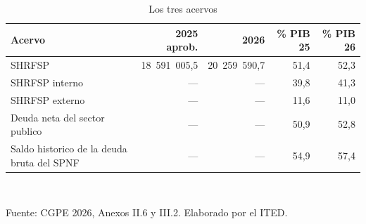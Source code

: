 \begin{table}[htbp]
\centering
\scriptsize
\caption{Los tres acervos}
\label{cua:C13_2}
\begin{tabular}{p{6.4cm}rrrr}
\toprule
\textbf{Acervo} & \textbf{2025 aprob.} & \textbf{2026} & \textbf{\% PIB 25} & \textbf{\% PIB 26} \\
\midrule
SHRFSP & 18 591 005,5 & 20 259 590,7 & 51,4 & 52,3 \\
SHRFSP interno & --- & --- & 39,8 & 41,3 \\
SHRFSP externo & --- & --- & 11,6 & 11,0 \\
Deuda neta del sector publico & --- & --- & 50,9 & 52,8 \\
Saldo historico de la deuda bruta del SPNF & --- & --- & 54,9 & 57,4 \\
\bottomrule
\end{tabular}
\\[2pt]\begin{minipage}{0.92\textwidth}\scriptsize Fuente: CGPE 2026, Anexos II.6 y III.2. Elaborado por el ITED.\end{minipage}
\end{table}
